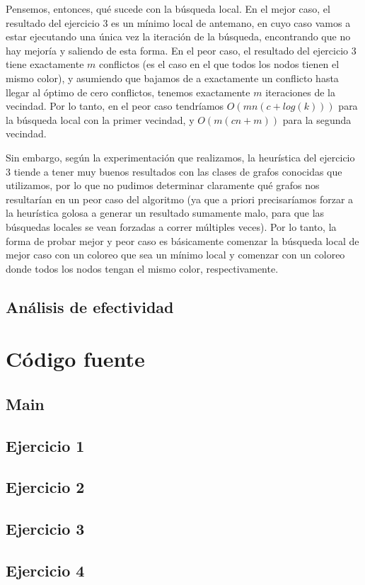 \documentclass{article}
\theoremstyle{definition}
\theoremstyle{remark}
\begin{document}
Pensemos, entonces, qué sucede con la búsqueda local. En el mejor caso, el resultado del ejercicio 3 es un mínimo local de antemano, en cuyo caso vamos a estar ejecutando una única vez la iteración de la búsqueda, encontrando que no hay mejoría y saliendo de esta forma. En el peor caso, el resultado del ejercicio 3 tiene exactamente $m$ conflictos (es el caso en el que todos los nodos tienen el mismo color), y asumiendo que bajamos de a exactamente un conflicto hasta llegar al óptimo de cero conflictos, tenemos exactamente $m$ iteraciones de la vecindad. Por lo tanto, en el peor caso tendríamos $O(mn(c + log(k)))$ para la búsqueda local con la primer vecindad, y $O(m(cn + m))$ para la segunda vecindad.

Sin embargo, según la experimentación que realizamos, la heurística del ejercicio 3 tiende a tener muy buenos resultados con las clases de grafos conocidas que utilizamos, por lo que no pudimos determinar claramente qué grafos nos resultarían en un peor caso del algoritmo (ya que a priori precisaríamos forzar a la heurística golosa a generar un resultado sumamente malo, para que las búsquedas locales se vean forzadas a correr múltiples veces). Por lo tanto, la forma de probar mejor y peor caso es básicamente comenzar la búsqueda local de mejor caso con un coloreo que sea un mínimo local y comenzar con un coloreo donde todos los nodos tengan el mismo color, respectivamente.


\subsection{Análisis de efectividad}



\section{Código fuente}

\lstset{inputencoding=utf8/latin1}
\lstset{basicstyle=\footnotesize\ttfamily,breaklines=true}
\lstset{framextopmargin=50pt,frame=bottomline}

\subsection{Main}
%

\subsection{Ejercicio 1}
%
%

\subsection{Ejercicio 2}
%
%

\subsection{Ejercicio 3}
%
%

\subsection{Ejercicio 4}
\end{document}
